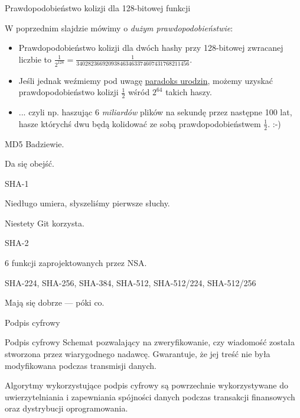 \begin{frame}{Prawdopodobieństwo kolizji dla 128-bitowej funkcji}
	
	W poprzednim slajdzie mówimy o \emph{dużym prawdopodobieństwie}:

	\begin{itemize}
		\item Prawdopodobieństwo kolizji dla dwóch hashy przy 128-bitowej zwracanej liczbie to $\frac{1}{2^{128}}=\frac{1}{340282366920938463463374607431768211456}$.
		
		\item Jeśli jednak weźmiemy pod uwagę \href{http://en.wikipedia.org/wiki/Birthday_problem}{paradoks urodzin}, możemy uzyskać prawdopodobieństwo kolizji $\frac{1}{2}$ wśród $2^{64}$ takich haszy.
		
		\item ... czyli np. haszując 6 \emph{miliardów} plików na sekundę przez następne 100 lat, hasze którychś dwu będą kolidować ze sobą prawdopodobieństwem $\frac{1}{2}$. :-)
	\end{itemize}	
	
\end{frame}

\begin{frame}{MD5}
	Badziewie.
	
	Da się obejść.
\end{frame}

\begin{frame}{SHA-1}
	
	Niedługo umiera, słyszeliśmy pierwsze słuchy.
	
	Niestety Git korzysta.
	
\end{frame}

\begin{frame}{SHA-2}
	
	6 funkcji zaprojektowanych przez NSA.
	
	SHA-224, SHA-256, SHA-384, SHA-512, SHA-512/224, SHA-512/256
	
	Mają się dobrze --- póki co.
	
\end{frame}

\begin{frame}{Podpis cyfrowy}
	\begin{alertblock}{Podpis cyfrowy}
		Schemat pozwalający na zweryfikowanie, czy wiadomość została stworzona przez wiarygodnego nadawcę. Gwarantuje, że jej treść nie była modyfikowana podczas transmisji danych.
	\end{alertblock}	
	Algorytmy wykorzystujące podpis cyfrowy są powrzechnie wykorzystywane	 do uwierzytelniania i zapewniania spójności danych podczas transakcji finansowych oraz dystrybucji oprogramowania. 
\end{frame}

